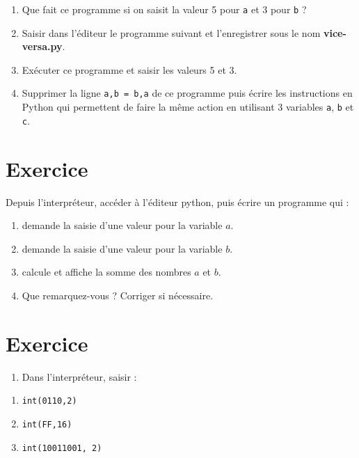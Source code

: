 \documentclass[11pt]{article}
\providecommand{\tightlist}{%
      \setlength{\itemsep}{0pt}\setlength{\parskip}{0pt}}
\begin{document}
\begin{enumerate}
\def\labelenumi{\arabic{enumi}.}
\tightlist
\item
  Que fait ce programme si on saisit la valeur 5 pour \texttt{a} et 3
  pour \texttt{b} ?
\item
  Saisir dans l'éditeur le programme suivant et l'enregistrer sous le
  nom \textbf{vice-versa.py}.
\item
  Exécuter ce programme et saisir les valeurs 5 et 3.
\item
  Supprimer la ligne \texttt{a,b\ =\ b,a} de ce programme puis écrire
  les instructions en Python qui permettent de faire la même action en
  utilisant 3 variables \texttt{a}, \texttt{b} et \texttt{c}.
\end{enumerate}

    \hypertarget{exercice}{%
\section{Exercice}\label{exercice}}

Depuis l'interpréteur, accéder à l'éditeur python, puis écrire un
programme qui :

\begin{enumerate}
\def\labelenumi{\arabic{enumi}.}
\tightlist
\item
  demande la saisie d'une valeur pour la variable \(a\).
\item
  demande la saisie d'une valeur pour la variable \(b\).
\item
  calcule et affiche la somme des nombres \(a\) et \(b\).
\item
  Que remarquez-vous ? Corriger si nécessaire.
\end{enumerate}

    \hypertarget{exercice}{%
\section{Exercice}\label{exercice}}

\begin{enumerate}
\def\labelenumi{\arabic{enumi}.}
\tightlist
\item
  Dans l'interpréteur, saisir :
\end{enumerate}

\begin{enumerate}
\def\labelenumi{\alph{enumi})}

\item
  \texttt{int(\textquotesingle{}0110\textquotesingle{},2)}
\item
  \texttt{int(\textquotesingle{}FF\textquotesingle{},16)}
\item
  \texttt{int(\textquotesingle{}10011001\textquotesingle{},\ 2)}
\end{enumerate}
\end{document}
